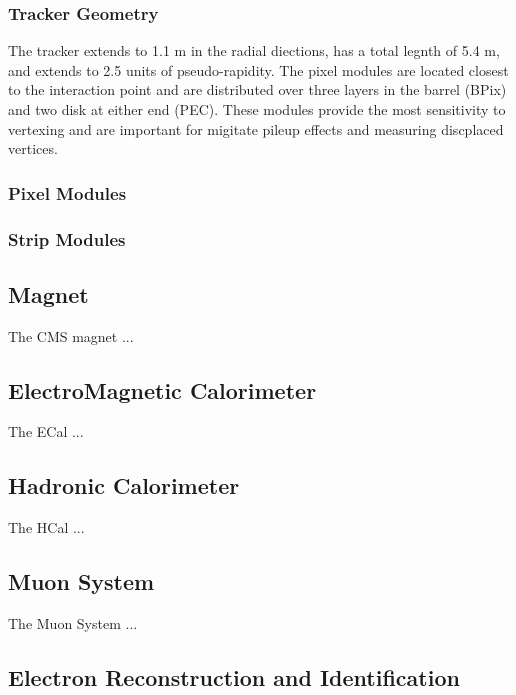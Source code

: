\subsubsection{Tracker Geometry}

The tracker extends to 1.1 m in the radial diections,  has a total legnth 
of 5.4 m, and extends to 2.5 units of pseudo-rapidity.  The pixel modules
are located closest to the interaction point and are distributed over three
layers in the barrel (BPix) and two disk at either end (PEC).  These modules
provide the most sensitivity to vertexing and are important for migitate 
pileup effects and measuring discplaced vertices.  

\subsubsection{Pixel Modules}



\subsubsection{Strip Modules}


\subsection{Magnet}
\label{sec:Magnet}

The CMS magnet ...

\subsection{ElectroMagnetic Calorimeter}
\label{sec:ECal}

The ECal ...

\subsection{Hadronic Calorimeter}
\label{sec:HCal}

The HCal ...

\subsection{Muon System}
\label{sec:Muon System}

The Muon System ...


\subsection{Electron Reconstruction and Identification}
\label{sec:HZZ4lelectrons}

